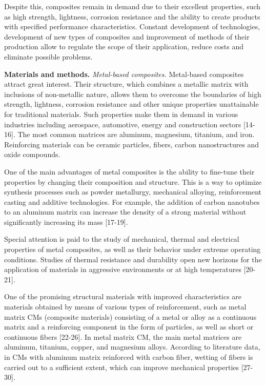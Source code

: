 \begin{multicols}{2}
Despite this, composites remain in demand due to their excellent
properties, such as high strength, lightness, corrosion resistance and
the ability to create products with specified performance
characteristics. Constant development of technologies, development of
new types of composites and improvement of methods of their production
allow to regulate the scope of their application, reduce costs and
eliminate possible problems.

{\bfseries Materials and methods.} \emph{Metal-based composites.}
Metal-based composites attract great interest. Their structure, which
combines a metallic matrix with inclusions of non-metallic nature,
allows them to overcome the boundaries of high strength, lightness,
corrosion resistance and other unique properties unattainable for
traditional materials. Such properties make them in demand in various
industries including aerospace, automotive, energy and construction
sectors {[}14-16{]}. The most common matrices are aluminum, magnesium,
titanium, and iron. Reinforcing materials can be ceramic particles,
fibers, carbon nanostructures and oxide compounds.

One of the main advantages of metal composites is the ability to
fine-tune their properties by changing their composition and structure.
This is a way to optimize synthesis processes such as powder metallurgy,
mechanical alloying, reinforcement casting and additive technologies.
For example, the addition of carbon nanotubes to an aluminum matrix can
increase the density of a strong material without significantly
increasing its mass {[}17-19{]}.

Special attention is paid to the study of mechanical, thermal and
electrical properties of metal composites, as well as their behavior
under extreme operating conditions. Studies of thermal resistance and
durability open new horizons for the application of materials in
aggressive environments or at high temperatures {[}20-21{]}.

One of the promising structural materials with improved characteristics
are materials obtained by means of various types of reinforcement, such
as metal matrix CMs (composite materials) consisting of a metal or alloy
as a continuous matrix and a reinforcing component in the form of
particles, as well as short or continuous fibers {[}22-26{]}. In metal
matrix CM, the main metal matrices are aluminum, titanium, copper, and
magnesium alloys. According to literature data, in CMs with aluminum
matrix reinforced with carbon fiber, wetting of fibers is carried out to
a sufficient extent, which can improve mechanical properties
{[}27-30{]}.


\end{multicols}
